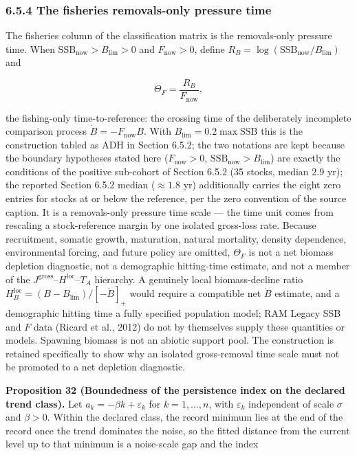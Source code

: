 \documentclass[11pt]{article}
\begin{document}
\subsubsection*{6.5.4 The fisheries removals-only pressure time}\label{654-the-fisheries-removals-only-pressure-time}

The fisheries column of the classification matrix is the removals-only pressure time. When \(\mathrm{SSB}_{\mathrm{now}} > B_{\lim} > 0\) and \(F_{\mathrm{now}} > 0\), define \(R_B =\allowbreak{} \log(\mathrm{SSB}_{\mathrm{now}}/B_{\lim})\) and 

$$\Theta_F = \frac{R_B}{F_{\mathrm{now}}},$$

 the fishing-only time-to-reference: the crossing time of the deliberately incomplete comparison process \(\dot B = -F_{\mathrm{now}}B\). With \(B_{\lim} =\allowbreak{} 0.2 \max \mathrm{SSB}\) this is the construction tabled as ADH in Section 6.5.2; the two notations are kept because the boundary hypotheses stated here (\(F_{\mathrm{now}} > 0\), \(\mathrm{SSB}_{\mathrm{now}} > B_{\lim}\)) are exactly the conditions of the positive sub-cohort of Section 6.5.2 (35 stocks, median \(2.9\) yr); the reported Section 6.5.2 median (\(\approx 1.8\) yr) additionally carries the eight zero entries for stocks at or below the reference, per the zero convention of the source caption. It is a removals-only pressure time scale --- the time unit comes from rescaling a stock-reference margin by one isolated gross-loss rate. Because recruitment, somatic growth, maturation, natural mortality, density dependence, environmental forcing, and future policy are omitted, \(\Theta_F\) is not a net biomass depletion diagnostic, not a demographic hitting-time estimate, and not a member of the \(J^{\mathrm{gross}}\)--\(H^{\mathrm{loc}}\)--\(T_A\) hierarchy. A genuinely local biomass-decline ratio \(H_B^{\mathrm{loc}} =\allowbreak{} (B - B_{\lim})/[-\dot B]_+\allowbreak{}\) would require a compatible net \(\dot B\) estimate, and a demographic hitting time a fully specified population model; RAM Legacy SSB and \(F\) data (Ricard et al., 2012) do not by themselves supply these quantities or models. Spawning biomass is not an abiotic support pool. The construction is retained specifically to show why an isolated gross-removal time scale must not be promoted to a net depletion diagnostic.

\textbf{Proposition 32 (Boundedness of the persistence index on the declared trend class).} Let \(a_k=-\beta k+\varepsilon_k\) for \(k=1,\dots,n\), with \(\varepsilon_k\) independent of scale \(\sigma\) and \(\beta>0\). Within the declared class, the record minimum lies at the end of the record once the trend dominates the noise, so the fitted distance from the current level up to that minimum is a noise-scale gap and the index 
\end{document}
